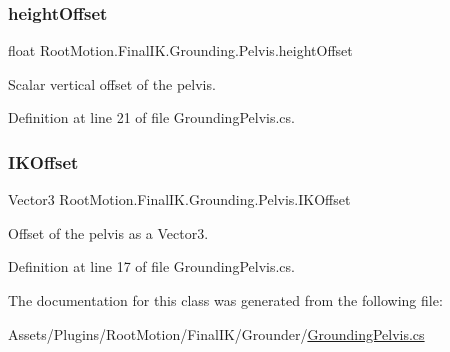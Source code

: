 \subsubsection{\texorpdfstring{height\+Offset}{heightOffset}}
{\footnotesize\ttfamily float Root\+Motion.\+Final\+I\+K.\+Grounding.\+Pelvis.\+height\+Offset\hspace{0.3cm}{\ttfamily [get]}}



Scalar vertical offset of the pelvis. 



Definition at line 21 of file Grounding\+Pelvis.\+cs.

\mbox{\label{class_root_motion_1_1_final_i_k_1_1_grounding_1_1_pelvis_aefc0e59c0c682ed6447099c01eec8cb9}} 
\subsubsection{\texorpdfstring{I\+K\+Offset}{IKOffset}}
{\footnotesize\ttfamily Vector3 Root\+Motion.\+Final\+I\+K.\+Grounding.\+Pelvis.\+I\+K\+Offset\hspace{0.3cm}{\ttfamily [get]}}



Offset of the pelvis as a Vector3. 



Definition at line 17 of file Grounding\+Pelvis.\+cs.



The documentation for this class was generated from the following file\+:\begin{DoxyCompactItemize}
\item 
Assets/\+Plugins/\+Root\+Motion/\+Final\+I\+K/\+Grounder/\mbox{\hyperlink{_grounding_pelvis_8cs}{Grounding\+Pelvis.\+cs}}\end{DoxyCompactItemize}
